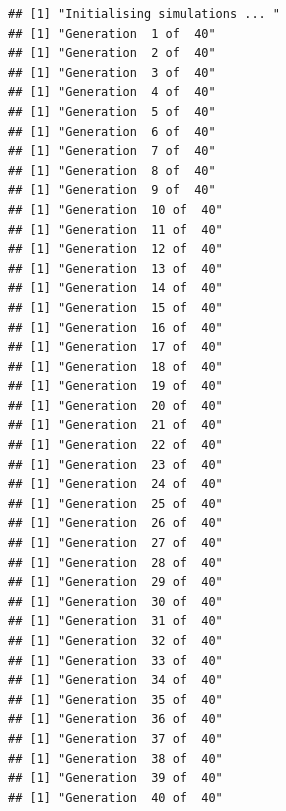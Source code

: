 \documentclass[
]{article}
\newenvironment{Shaded}{\begin{snugshade}}{\end{snugshade}}
\newcommand{\CommentTok}[1]{\textcolor[rgb]{0.50,0.62,0.50}{#1}}
\newcommand{\DataTypeTok}[1]{\textcolor[rgb]{0.87,0.87,0.75}{#1}}
\newcommand{\DecValTok}[1]{\textcolor[rgb]{0.86,0.86,0.80}{#1}}
\newcommand{\NormalTok}[1]{\textcolor[rgb]{0.80,0.80,0.80}{#1}}
\newcommand{\OtherTok}[1]{\textcolor[rgb]{0.94,0.94,0.56}{#1}}
\begin{document}
\begin{Shaded}
\end{Shaded}

\begin{verbatim}
## [1] "Initialising simulations ... "
## [1] "Generation  1 of  40"
## [1] "Generation  2 of  40"
## [1] "Generation  3 of  40"
## [1] "Generation  4 of  40"
## [1] "Generation  5 of  40"
## [1] "Generation  6 of  40"
## [1] "Generation  7 of  40"
## [1] "Generation  8 of  40"
## [1] "Generation  9 of  40"
## [1] "Generation  10 of  40"
## [1] "Generation  11 of  40"
## [1] "Generation  12 of  40"
## [1] "Generation  13 of  40"
## [1] "Generation  14 of  40"
## [1] "Generation  15 of  40"
## [1] "Generation  16 of  40"
## [1] "Generation  17 of  40"
## [1] "Generation  18 of  40"
## [1] "Generation  19 of  40"
## [1] "Generation  20 of  40"
## [1] "Generation  21 of  40"
## [1] "Generation  22 of  40"
## [1] "Generation  23 of  40"
## [1] "Generation  24 of  40"
## [1] "Generation  25 of  40"
## [1] "Generation  26 of  40"
## [1] "Generation  27 of  40"
## [1] "Generation  28 of  40"
## [1] "Generation  29 of  40"
## [1] "Generation  30 of  40"
## [1] "Generation  31 of  40"
## [1] "Generation  32 of  40"
## [1] "Generation  33 of  40"
## [1] "Generation  34 of  40"
## [1] "Generation  35 of  40"
## [1] "Generation  36 of  40"
## [1] "Generation  37 of  40"
## [1] "Generation  38 of  40"
## [1] "Generation  39 of  40"
## [1] "Generation  40 of  40"
\end{verbatim}
\end{document}
